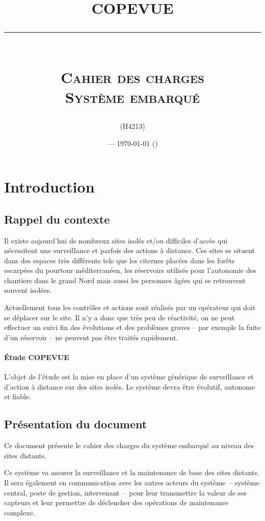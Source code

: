 \documentclass[a4paper, 11pt, final]{article}
\title{\textbf{COPEVUE}\\
\rule{\textwidth}{1pt}{}\\
\Huge{\textsc{Cahier des charges \\ Système embarqué}}}
\author{\docauthor{} (H4213)}
\date{\docname{} --- \today{} (\docstatus{})}
\begin{document}
\maketitle

\tableofcontents

\section{Introduction}

\subsection{Rappel du contexte}


Il existe aujourd'hui de nombreux sites isolés et/ou difficiles d'accès qui nécessitent une surveillance et parfois des actions à distance. Ces sites se situent dans des espaces très différents tels que les citernes placées dans les forêts escarpées du pourtour méditerranéen, les réservoirs utilisés pour l'autonomie des chantiers dans le grand Nord mais aussi les personnes âgées qui se retrouvent souvent isolées.

Actuellement tous les contrôles et actions sont réalisés par un opérateur qui doit se déplacer sur le site. Il n'y a donc que très peu de réactivité, on ne peut effectuer un suivi fin des évolutions et des problèmes graves -- par exemple la fuite d'un réservoir -- ne peuvent pas être traités rapidement.

\paragraph{Étude COPEVUE}
L'objet de l'étude est la mise en place d'un système générique de surveillance et d'action à distance sur des sites isolés. Le système devra être évolutif, autonome et fiable.


\subsection{Présentation du document}
Ce document présente le cahier des charges du système embarqué au niveau des sites distants. 

Ce système va assurer la surveillance et la maintenance de base des sites distants. Il sera également en communication avec les autres acteurs du système~-- système central, poste de gestion, intervenant~-- pour leur transmettre la valeur de ses capteurs et leur permettre de déclencher des opérations de maintenance complexe.
\end{document}
